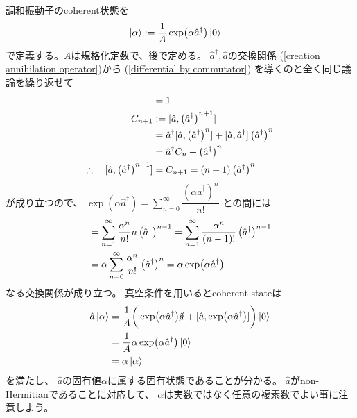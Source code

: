 調和振動子のcoherent状態を
\begin{align}
    \ket{\alpha}
    &:=
    \dfrac{1}{A}
    \exp(\alpha \hat{a}^\dagger)
    \ket{0}
\end{align}
で定義する。$A$は規格化定数で、後で定める。
$\hat{a}^\dagger, \hat{a}$の交換関係
(\ref{creation annihilation operator})から
(\ref{differential by commutator})
を導くのと全く同じ議論を繰り返せて
\begin{align}
    [\hat{a},\hat{a}^\dagger]
    &= 1
\notag\\
    C_{n+1}
    &:=
    [\hat{a},\left(\hat{a}^\dagger\right)^{n+1}]
\notag\\
    &=
    \hat{a}^\dagger
    [\hat{a},\left(\hat{a}^\dagger\right)^{n}]
    +
    [\hat{a},\hat{a}^\dagger]
    \left(\hat{a}^\dagger\right)^{n}
\notag\\
    &= \hat{a}^\dagger C_n
     + \left(\hat{a}^\dagger\right)^{n}
\notag\\
    \therefore\quad
    [\hat{a},\left(\hat{a}^\dagger\right)^{n+1}]
    &=
    C_{n+1} =
    (n+1) \left(\hat{a}^\dagger\right)^{n}
\label{creation n-th power commutation}
\end{align}
が成り立つので、
$\displaystyle
\exp(\alpha \hat{a}^\dagger)
=
\sum_{n=0}^\infty
\dfrac{
    \left(\alpha \hat{a}^\dagger\right)^n
}{n!}
$
との間には
\begin{align}
    [ \hat{a}, \exp(\alpha \hat{a}^\dagger) ]
&=
    \sum_{n=1}^\infty
    \dfrac{
        \alpha^n
    }{n!}
    n \left(\hat{a}^\dagger\right)^{n-1}
=
    \sum_{n=1}^\infty
    \dfrac{
        \alpha^n
    }{(n-1)!}
    \left(\hat{a}^\dagger\right)^{n-1}
\notag\\&=
    \alpha
    \sum_{n=0}^\infty
    \dfrac{
        \alpha^n
    }{n!}
    \left(\hat{a}^\dagger\right)^{n}
=
    \alpha
    \exp(\alpha \hat{a}^\dagger)
\label{coherent commutator}
\end{align}
なる交換関係が成り立つ。
真空条件を用いるとcoherent stateは
\begin{align}
    \hat{a}
    \ket{\alpha}
    &=
    \dfrac{1}{A}
    \bigg(
        \exp(\alpha \hat{a}^\dagger)
        \cancel{ \hat{a} }
        +
        [ \hat{a} , \exp(\alpha \hat{a}^\dagger) ]
    \bigg)
    \ket{0}
\notag\\ &=
    \dfrac{1}{A}
    \alpha\exp(\alpha \hat{a}^\dagger)
    \ket{0}
\notag\\ &=
    \alpha
    \ket{\alpha}
\end{align}
を満たし、
$\hat{a}$の固有値$\alpha$に属する固有状態であることが分かる。
$\hat{a}$がnon-Hermitianであることに対応して、
$\alpha$は実数ではなく任意の複素数でよい事に注意しよう。

